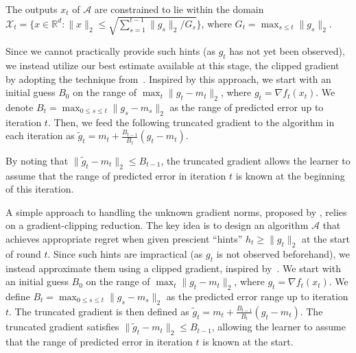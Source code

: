 \documentclass{article}
\renewcommand{\citet}{\citep}
\theoremstyle{plain}
\theoremstyle{definition}
\theoremstyle{remark}
\newcommand{\cA}{\mathcal{A}}
\newcommand{\cX}{\mathcal{X}}
\newcommand{\regret}{\mathfrak{R}}
\newcommand{\real}{\mathbb{R}}
\renewcommand{\tilde}{\widetilde}
\begin{document}
The outputs $x_t$ of $\cA$ are constrained to lie within the domain $\cX_t = \{x \in \real^d : \|x\|_2 \leq \sqrt{\sum_{s=1}^{t-1} \|g_s\|_2/G_s}\}$, where $G_t = \max_{s \leq t} \|g_s\|_2$.
\fi

Since we cannot practically provide such hints (as $g_t$ has not yet been observed), we instead utilize our best estimate available at this stage, the clipped gradient by adopting the technique from~\cite{cutkosky2019artificial}. Inspired by this approach, we start with an initial guess $B_0$ on the range of $\max_{t}\|g_t-m_t\|_2$, where $g_t=\nabla f_t(x_t)$. We denote $B_t=\max_{0\leq s\leq t}\|g_s-m_s\|_2$ as the range of predicted error up to iteration $t$. Then, we feed the following truncated gradient to the algorithm in each iteration as $\tilde{g}_t=m_t+\frac{B_{t-1}}{B_t}(g_t-m_t)$.

By noting that $\|\tilde{g}_t-m_t\|_2\leq B_{t-1}$, the truncated gradient allows the learner to assume that the range of predicted error in iteration $t$ is known at the beginning of this iteration.
\fi

A simple approach to handling the unknown gradient norms, proposed by \citet{cutkosky2019artificial}, relies on a gradient-clipping reduction. The key idea is to design an algorithm $\cA$ that achieves appropriate regret when given prescient ``hints'' $h_t \geq \|g_t\|_2$ at the start of round $t$. Since such hints are impractical (as $g_t$ is not observed beforehand), we instead approximate them using a clipped gradient, inspired by~\cite{cutkosky2019artificial}. We start with an initial guess $B_0$ on the range of $\max_{t} \|g_t - m_t\|_2$, where $g_t=\nabla f_t(x_t)$. We define $B_t=\max_{0 \leq s \leq t} \|g_s - m_s\|_2$ as the predicted error range up to iteration $t$. The truncated gradient is then defined as $\tilde{g}_t = m_t + \frac{B_{t-1}}{B_t} (g_t - m_t)$. The truncated gradient satisfies $\|\tilde{g}_t - m_t\|_2 \leq B_{t-1}$, allowing the learner to assume that the range of predicted error in iteration $t$ is known at the start.
\end{document}
